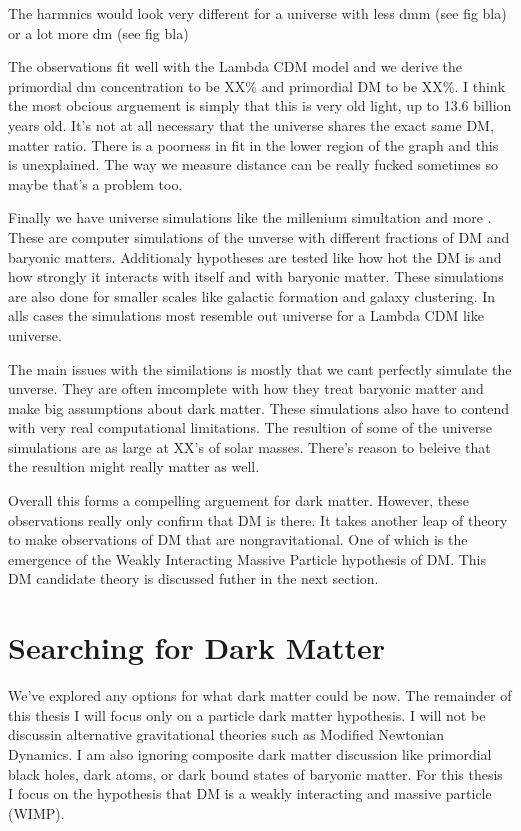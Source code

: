 
The harmnics would look very different for a universe with less dmm (see fig bla) or a lot more dm (see fig bla)


The observations fit well with the Lambda CDM model and we derive the primordial dm concentration to be XX\% and primordial DM to be XX\%.
 I think the most obcious arguement is simply that this is very old light, up to 13.6 billion years old.
It's not at all necessary that the universe shares the exact same DM, matter ratio.
There is a poorness in fit in the lower region of the graph and this is unexplained.
The way we measure distance can be really fucked sometimes so maybe that's a problem too.

Finally we have universe simulations like the millenium simultation and more \fu \ns.
These are computer simulations of the unverse with different fractions of DM and baryonic matters.
Additionaly hypotheses are tested like how hot the DM is and how strongly it interacts with itself and with baryonic matter.
These simulations are also done for smaller scales like galactic formation and galaxy clustering.
In alls cases the simulations most resemble out universe for a Lambda CDM like universe.

The main issues with the similations is mostly that we cant perfectly simulate the unverse.
They are often imcomplete with how they treat baryonic matter and make big assumptions about dark matter.
These simulations also have to contend with very real computational limitations.
The resultion of some of the universe simulations are as large at XX's of solar masses.
There's reason to beleive that the resultion might really matter as well. \ns \fu


Overall this forms a compelling arguement for dark matter.
However, these observations really only confirm that DM is there.
It takes another leap of theory to make observations of DM that are nongravitational.
One of which is the emergence of the Weakly Interacting Massive Particle hypothesis of DM.
This DM candidate theory is discussed futher in the next section.

\section{Searching for Dark Matter}\label{sec:dm_search}
We've explored any options for what dark matter could be now.
The remainder of this thesis I will focus only on a particle dark matter hypothesis.
I will not be discussin alternative gravitational theories such as Modified Newtonian Dynamics.
I am also ignoring composite dark matter discussion like primordial black holes, dark atoms, or dark bound states of baryonic matter.
For this thesis I focus on the hypothesis that DM is a weakly interacting and massive particle (WIMP).

